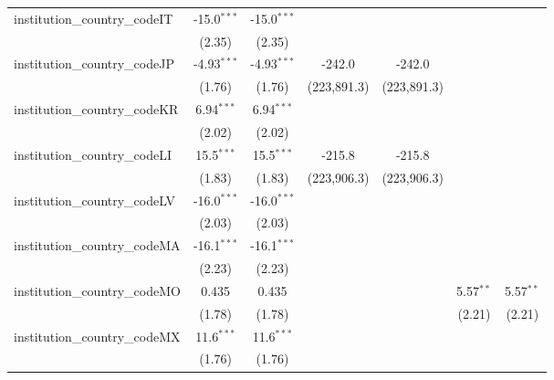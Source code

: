 \begin{tabular}{lcccccc}
   institution\_country\_codeIT          & -15.0$^{***}$ & -15.0$^{***}$ &               &               &               &   \\   
                                         & (2.35)        & (2.35)        &               &               &               &   \\   
   institution\_country\_codeJP          & -4.93$^{***}$ & -4.93$^{***}$ & -242.0        & -242.0        &               &   \\   
                                         & (1.76)        & (1.76)        & (223,891.3)   & (223,891.3)   &               &   \\   
   institution\_country\_codeKR          & 6.94$^{***}$  & 6.94$^{***}$  &               &               &               &   \\   
                                         & (2.02)        & (2.02)        &               &               &               &   \\   
   institution\_country\_codeLI          & 15.5$^{***}$  & 15.5$^{***}$  & -215.8        & -215.8        &               &   \\   
                                         & (1.83)        & (1.83)        & (223,906.3)   & (223,906.3)   &               &   \\   
   institution\_country\_codeLV          & -16.0$^{***}$ & -16.0$^{***}$ &               &               &               &   \\   
                                         & (2.03)        & (2.03)        &               &               &               &   \\   
   institution\_country\_codeMA          & -16.1$^{***}$ & -16.1$^{***}$ &               &               &               &   \\   
                                         & (2.23)        & (2.23)        &               &               &               &   \\   
   institution\_country\_codeMO          & 0.435         & 0.435         &               &               & 5.57$^{**}$   & 5.57$^{**}$\\   
                                         & (1.78)        & (1.78)        &               &               & (2.21)        & (2.21)\\   
   institution\_country\_codeMX          & 11.6$^{***}$  & 11.6$^{***}$  &               &               &               &   \\   
                                         & (1.76)        & (1.76)        &               &               &               &   \\   

\end{tabular}
